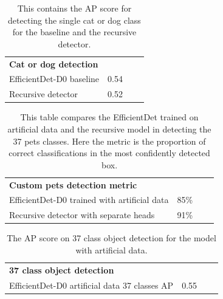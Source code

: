 \begin{table}
    \centering
    \begin{tabular}{lccl}
        \multicolumn{1}{l}{\textbf{Cat or dog detection}}    & \multicolumn{1}{l}{\textbf{}}  \\ \cline{1-2}
        \multicolumn{1}{l}{EfficientDet-D0 baseline} & \multicolumn{1}{c}{0.54}                       \\ \hline
        \multicolumn{1}{l}{Recursive detector}       & \multicolumn{1}{c}{0.52}                    \\ \hline
    \end{tabular}
    \caption {
        This contains the AP score for detecting the single cat or dog class for the baseline and the recursive detector.    
    }
\end{table}
\begin{table}
    \centering
    \begin{tabular}{lccl}
        \multicolumn{1}{l}{\textbf{Custom pets detection metric}}    & \multicolumn{1}{l}{\textbf{}}  \\ \cline{1-2}
        \multicolumn{1}{l}{EfficientDet-D0 trained with artificial data} & \multicolumn{1}{c}{85\%}     \\ \hline 
        \multicolumn{1}{l}{Recursive detector with separate heads}       & \multicolumn{1}{c}{91\%}                       \\ \hline
    \end{tabular}
    \caption {
        This table compares the EfficientDet trained on artificial data and the recursive model in detecting the 37 pets classes.
        Here the metric is the proportion of correct classifications in the most confidently detected box.
    }
\end{table}
\begin{table}
    \centering
    \begin{tabular}{lccl}
        \multicolumn{1}{l}{\textbf{37 class object detection}}    & \multicolumn{1}{l}{\textbf{}}  \\ \cline{1-2}
        \multicolumn{1}{l}{EfficientDet-D0 artificial data 37 classes AP} & \multicolumn{1}{c}{0.55}                       \\ \hline
    \end{tabular}
    \caption {
        The AP score on 37 class object detection for the model with artificial data.
    }
\end{table}

